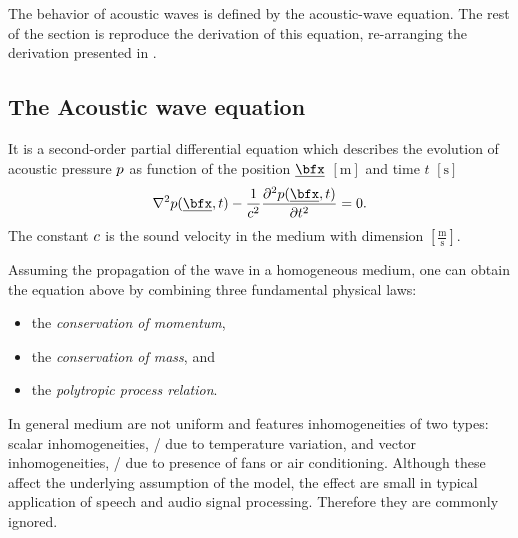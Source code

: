 The behavior of acoustic waves is defined by the acoustic-wave equation.
The rest of the section is reproduce the derivation of this equation, re-arranging the derivation presented in \cite{kuttruff2016room, pierce2019acoustics, marczuk2006modelling, avanzini2019sound}.

\subsection{The Acoustic wave equation}\label{subsec:acoustics:waveq}
It is a second-order partial differential equation
 which describes the evolution of acoustic pressure $p$
as function of the position $\positionMicrophone$ $[\si{\metre}]$ and time $t$ $[\si{\second}]$
\begin{equation}
    \label{eq:acoustics:wave}
    \knabla^2 \pressureSpaceTime - \frac{1}{\speedOfSound^2} \kpderiv[2]{\pressureSpaceTime}{t} = 0
    .
\end{equation}
The constant $c$ is the sound velocity in the medium with dimension $[\frac{\si{\metre}}{\si{\second}}]$.

Assuming the propagation of the wave in a homogeneous medium, one can obtain the equation above by combining three fundamental physical laws:
\begin{itemize}
    \item the \textit{conservation of momentum},
    \item the \textit{conservation of mass}, and
    \item the \textit{polytropic process relation}.
\end{itemize}

In general medium are not uniform and features inhomogeneities of two types:
scalar inhomogeneities, \eg/ due to temperature variation,
and vector inhomogeneities, \eg/ due to presence of fans or air conditioning.
Although these affect the underlying assumption of the model, the effect are small in typical application of speech and audio signal processing.
Therefore they are commonly ignored.

